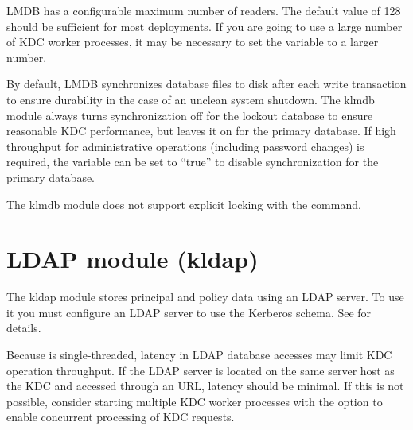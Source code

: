 \documentclass[letterpaper,10pt,english]{sphinxmanual}
\begin{document}
%
\begin{sphinxVerbatim}[commandchars=\\\{\}]
\PYG{p}{[}\PYG{p}{]}
      
          
          
\end{sphinxVerbatim}

LMDB has a configurable maximum number of readers.  The default value
of 128 should be sufficient for most deployments.  If you are going to
use a large number of KDC worker processes, it may be necessary to set
the  variable to a larger number.

By default, LMDB synchronizes database files to disk after each write
transaction to ensure durability in the case of an unclean system
shutdown.  The klmdb module always turns synchronization off for the
lockout database to ensure reasonable KDC performance, but leaves it
on for the primary database.  If high throughput for administrative
operations (including password changes) is required, the 
variable can be set to “true” to disable synchronization for the
primary database.

The klmdb module does not support explicit locking with the
{\hyperref[\detokenize{admin/admin_commands/kadmin_local:kadmin-1}]{}}  command.


\section{LDAP module (kldap)}
\label{\detokenize{admin/dbtypes:ldap-module-kldap}}
The kldap module stores principal and policy data using an LDAP
server.  To use it you must configure an LDAP server to use the
Kerberos schema.  See {\hyperref[\detokenize{admin/conf_ldap:conf-ldap}]{}} for details.

Because {\hyperref[\detokenize{admin/admin_commands/krb5kdc:krb5kdc-8}]{}} is single-threaded, latency in LDAP database
accesses may limit KDC operation throughput.  If the LDAP server is
located on the same server host as the KDC and accessed through an
 URL, latency should be minimal.  If this is not possible,
consider starting multiple KDC worker processes with the
{\hyperref[\detokenize{admin/admin_commands/krb5kdc:krb5kdc-8}]{}}  option to enable concurrent processing of KDC
requests.
\end{document}

